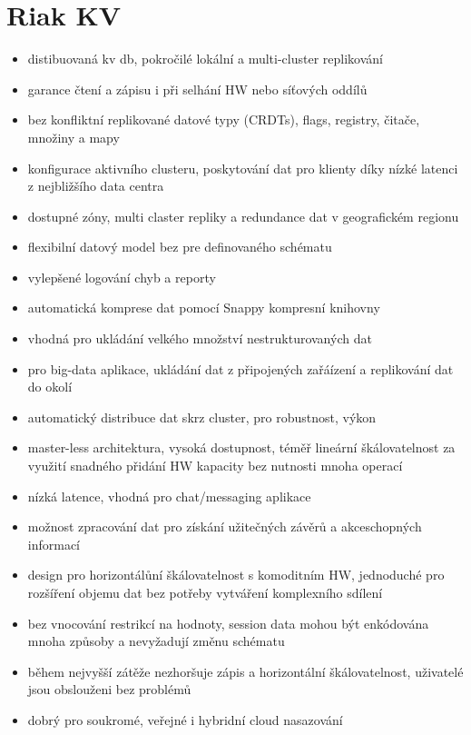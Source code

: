 \documentclass[czech,bachelor,dept460,male,csharp,cpdeclaration]{diploma}
\begin{document}
	\section{Riak KV}
		\begin{itemize}
			\item distibuovaná kv db, pokročilé lokální a multi-cluster replikování
			\item garance čtení a zápisu i při selhání HW nebo síťových oddílů
			\item bez konfliktní replikované datové typy (CRDTs), flags, registry, čitače, množiny a mapy
			\item konfigurace aktivního clusteru, poskytování dat pro klienty díky nízké latenci z nejbližšího data centra
			\item dostupné zóny, multi claster repliky a redundance dat v geografickém regionu
			\item flexibilní datový model bez pre definovaného schématu
			\item vylepšené logování chyb a reporty
			\item automatická komprese dat pomocí Snappy kompresní knihovny
			\item vhodná pro ukládání velkého množství nestrukturovaných dat
			\item pro big-data aplikace, ukládání dat z připojených zařáízení a replikování dat do okolí
			\item automatický distribuce dat skrz cluster, pro robustnost, výkon
			\item master-less architektura, vysoká dostupnost, téměř lineární škálovatelnost za využití snadného přidání HW kapacity bez nutnosti mnoha operací
			\item nízká latence, vhodná pro chat/messaging aplikace
			\item možnost zpracování dat pro získání užitečných závěrů a akceschopných informací
			\item design pro horizontálůní škálovatelnost s komoditním HW, jednoduché pro rozšíření objemu dat bez potřeby vytváření komplexního sdílení
			\item bez vnocování restrikcí na hodnoty, session data mohou být enkódována mnoha způsoby a nevyžadují změnu schématu
			\item během nejvyšší zátěže nezhoršuje zápis a horizontální škálovatelnost, uživatelé jsou obslouženi bez problémů
			\item dobrý pro soukromé, veřejné i hybridní cloud nasazování
		\end{itemize}
 
\end{document}
